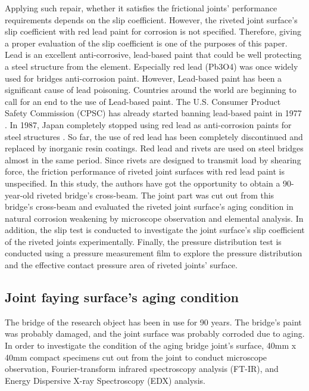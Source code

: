 Applying such repair, whether it satisfies the frictional joints' performance requirements depends on the slip coefficient. However, the riveted joint surface's slip coefficient with red lead paint for corrosion is not specified. Therefore, giving a proper evaluation of the slip coefficient is one of the purposes of this paper.
Lead is an excellent anti-corrosive, lead-based paint that could be well protecting a steel structure from the element. Especially red lead (Pb3O4) was once widely used for bridges anti-corrosion paint. However, Lead-based paint has been a significant cause of lead poisoning. Countries around the world are beginning to call for an end to the use of Lead-based paint. The U.S. Consumer Product Safety Commission (CPSC) has already started banning lead-based paint in 1977 \cite{CPSC1977}. In 1987, Japan completely stopped using red lead as anti-corrosion paints for steel structures \cite{rtri1987Steel}. So far, the use of red lead has been completely discontinued and replaced by inorganic resin coatings. Red lead and rivets are used on steel bridges almost in the same period. Since rivets are designed to transmit load by shearing force, the friction performance of riveted joint surfaces with red lead paint is unspecified. 
In this study, the authors have got the opportunity to obtain a 90-year-old riveted bridge's cross-beam. The joint part was cut out from this bridge's cross-beam and evaluated the riveted joint surface's aging condition in natural corrosion weakening by microscope observation and elemental analysis. In addition, the slip test is conducted to investigate the joint surface's slip coefficient of the riveted joints experimentally. Finally, the pressure distribution test is conducted using a pressure measurement film to explore the pressure distribution and the effective contact pressure area of riveted joints' surface.


\subsection{Joint faying surface's aging condition}

The bridge of the research object has been in use for 90 years. The bridge's paint was probably damaged, and the joint surface was probably corroded due to aging. In order to investigate the condition of the aging bridge joint's surface, 40mm x 40mm compact specimens cut out from the joint to conduct microscope observation, Fourier-transform infrared spectroscopy analysis (FT-IR), and Energy Dispersive X-ray Spectroscopy (EDX) analysis.

